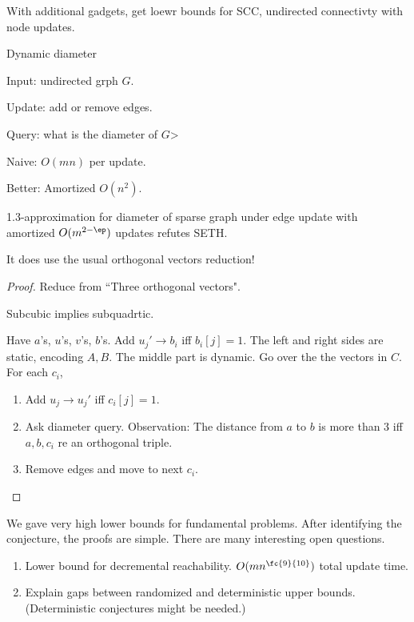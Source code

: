 With additional gadgets, get loewr bounds for SCC, undirected connectivty with node updates.

Dynamic diameter

\begin{prb}
Input: undirected grph $G$.

Update: add or remove edges.

Query: what is the diameter of $G$>
\end{prb}
Naive: $O(mn)$ per update.  

Better: Amortized $O(n^2)$.

\begin{thm}
1.3-approximation for diameter of sparse graph under edge update with amortized $O(m^{2-\ep})$ updates refutes SETH.
\end{thm}

It does use the usual orthogonal vectors reduction!
\begin{proof}
Reduce from ``Three orthogonal vectors". 

Subcubic implies subquadrtic.

Have $a$'s, $u$'s, $v$'s, $b$'s. Add $u_j'\to b_i$ iff $b_i[j]=1$. The left and right sides are static, encoding $A,B$. The middle part is dynamic. Go over the the vectors in $C$. For each $c_i$,
\begin{enumerate}
\item
Add $u_j\to u_j'$ iff $c_i[j]=1$.
\item
Ask diameter query.
Observation: The distance from $a$ to $b$ is more than 3 iff $a,b,c_i$ re an orthogonal triple.
\item Remove edges and move to next $c_i$.
\end{enumerate}
\end{proof}
We gave very high lower bounds for fundamental problems. After identifying the conjecture, the proofs are simple. There are many interesting open questions.
\begin{enumerate}
\item
Lower bound for decremental reachability. $O(mn^{\fc{9}{10}})$ total update time.

\item
Explain gaps between randomized and deterministic upper bounds. (Deterministic conjectures might be needed.)
\end{enumerate}

